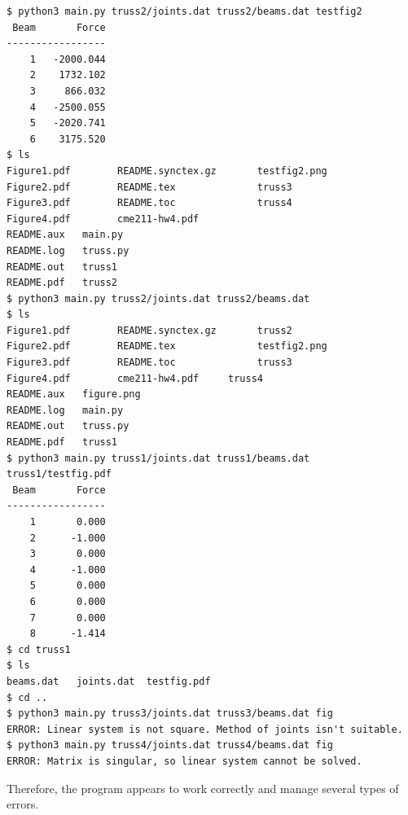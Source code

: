 \documentclass[11pt]{amsart}
\theoremstyle{definition}
\begin{document}
\begin{Verbatim}[fontsize=\small]
$ python3 main.py truss2/joints.dat truss2/beams.dat testfig2
 Beam       Force
-----------------
    1   -2000.044
    2    1732.102
    3     866.032
    4   -2500.055
    5   -2020.741
    6    3175.520
$ ls
Figure1.pdf        README.synctex.gz       testfig2.png
Figure2.pdf        README.tex              truss3
Figure3.pdf        README.toc              truss4
Figure4.pdf        cme211-hw4.pdf	
README.aux	 main.py		
README.log	 truss.py	
README.out	 truss1
README.pdf	 truss2
$ python3 main.py truss2/joints.dat truss2/beams.dat
$ ls
Figure1.pdf        README.synctex.gz       truss2				
Figure2.pdf        README.tex              testfig2.png
Figure3.pdf        README.toc              truss3
Figure4.pdf        cme211-hw4.pdf	  truss4
README.aux	 figure.png 		
README.log	 main.py 	
README.out	 truss.py 
README.pdf	 truss1
$ python3 main.py truss1/joints.dat truss1/beams.dat truss1/testfig.pdf
 Beam       Force
-----------------
    1       0.000
    2      -1.000
    3       0.000
    4      -1.000
    5       0.000
    6       0.000
    7       0.000
    8      -1.414
$ cd truss1
$ ls
beams.dat	joints.dat	testfig.pdf
$ cd ..
$ python3 main.py truss3/joints.dat truss3/beams.dat fig
ERROR: Linear system is not square. Method of joints isn't suitable.
$ python3 main.py truss4/joints.dat truss4/beams.dat fig
ERROR: Matrix is singular, so linear system cannot be solved.
\end{Verbatim}
Therefore, the program appears to work correctly and manage several types of errors.
\end{document}
